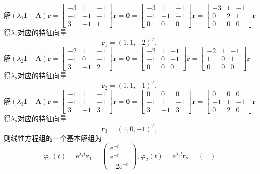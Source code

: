 \documentclass[12pt,UTF8]{ctexart}
\newcommand{\me}[0]{\mathrm e}
\begin{document}
\begin{enumerate}
解$(\lambda_1\bm I-\bm A)\bm r=\begin{bmatrix}
-3&1&-1\\
-1&-1&-1\\
3&-1&1
\end{bmatrix}\bm r=\bm0=\begin{bmatrix}
-3&1&-1\\
-1&-1&-1\\
0&0&0
\end{bmatrix}\bm r=\begin{bmatrix}
-3&1&-1\\
0&2&1\\
0&0&0
\end{bmatrix}\bm r$得$\lambda_1$对应的特征向量\[\bm r_1=(1,1,-2)^T,\]
解$(\lambda_2\bm I-\bm A)\bm r=\begin{bmatrix}
-2&1&-1\\
-1&0&-1\\
3&-1&2
\end{bmatrix}\bm r=\bm0=\begin{bmatrix}
-2&1&-1\\
-1&0&-1\\
0&0&0
\end{bmatrix}\bm r=\begin{bmatrix}
-2&1&-1\\
1&0&1\\
0&0&0
\end{bmatrix}\bm r$得$\lambda_2$对应的特征向量\[\bm r_2=(1,1,-1)^T,\]
解$(\lambda_3\bm I-\bm A)\bm r=\begin{bmatrix}
-1&1&-1\\
-1&1&-1\\
3&-1&3
\end{bmatrix}\bm r=\bm0=\begin{bmatrix}
0&0&0\\
-1&1&-1\\
3&-1&3
\end{bmatrix}\bm r=\begin{bmatrix}
0&0&0\\
-1&1&-1\\
0&2&0
\end{bmatrix}\bm r$得$\lambda_2$对应的特征向量\[\bm r_3=(1,0,-1)^T,\]
则线性方程组的一个基本解组为
\[\bm\varphi_1(t)=\me^{\lambda_1t}\bm r_1=\begin{pmatrix}
\me^{-t}\\\me^{-t}\\-2\me^{-t}
\end{pmatrix},\bm\varphi_2(t)=\me^{\lambda_2t}\bm r_2=\begin{pmatrix}

\end{pmatrix}\]
\end{enumerate}
\end{document}

